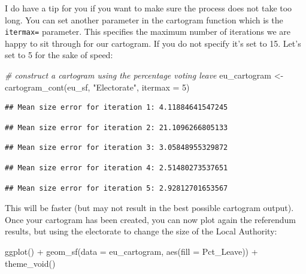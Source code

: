\documentclass[
]{book}
\newenvironment{Shaded}{\begin{snugshade}}{\end{snugshade}}
\newcommand{\AttributeTok}[1]{\textcolor[rgb]{0.77,0.63,0.00}{#1}}
\newcommand{\CommentTok}[1]{\textcolor[rgb]{0.56,0.35,0.01}{\textit{#1}}}
\newcommand{\DecValTok}[1]{\textcolor[rgb]{0.00,0.00,0.81}{#1}}
\newcommand{\FunctionTok}[1]{\textcolor[rgb]{0.00,0.00,0.00}{#1}}
\newcommand{\NormalTok}[1]{#1}
\newcommand{\OtherTok}[1]{\textcolor[rgb]{0.56,0.35,0.01}{#1}}
\newcommand{\SpecialCharTok}[1]{\textcolor[rgb]{0.00,0.00,0.00}{#1}}
\newcommand{\StringTok}[1]{\textcolor[rgb]{0.31,0.60,0.02}{#1}}
\begin{document}
I do have a tip for you if you want to make sure the process does not take too long. You can set another parameter in the cartogram function which is the \texttt{itermax=} parameter. This specifies the maximum number of iterations we are happy to sit through for our cartogram. If you do not specify it's set to 15. Let's set to 5 for the sake of speed:

\begin{Shaded}
\begin{Highlighting}[]
\CommentTok{\# construct a cartogram using the percentage voting leave}
\NormalTok{eu\_cartogram }\OtherTok{\textless{}{-}} \FunctionTok{cartogram\_cont}\NormalTok{(eu\_sf, }\StringTok{"Electorate"}\NormalTok{, }\AttributeTok{itermax =} \DecValTok{5}\NormalTok{)}
\end{Highlighting}
\end{Shaded}

\begin{verbatim}
## Mean size error for iteration 1: 4.11884641547245
\end{verbatim}

\begin{verbatim}
## Mean size error for iteration 2: 21.1096266805133
\end{verbatim}

\begin{verbatim}
## Mean size error for iteration 3: 3.05848955329872
\end{verbatim}

\begin{verbatim}
## Mean size error for iteration 4: 2.51480273537651
\end{verbatim}

\begin{verbatim}
## Mean size error for iteration 5: 2.92812701653567
\end{verbatim}

This will be faster (but may not result in the best possible cartogram output). Once your cartogram has been created, you can now plot again the referendum results, but using the electorate to change the size of the Local Authority:

\begin{Shaded}
\begin{Highlighting}[]
\FunctionTok{ggplot}\NormalTok{() }\SpecialCharTok{+}
  \FunctionTok{geom\_sf}\NormalTok{(}\AttributeTok{data =}\NormalTok{ eu\_cartogram, }\FunctionTok{aes}\NormalTok{(}\AttributeTok{fill =}\NormalTok{ Pct\_Leave)) }\SpecialCharTok{+} 
  \FunctionTok{theme\_void}\NormalTok{()}
\end{Highlighting}
\end{Shaded}
\end{document}
